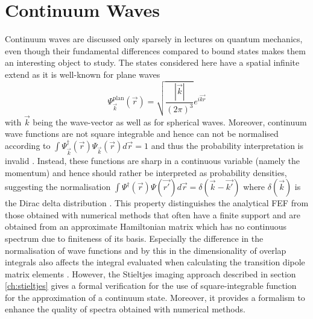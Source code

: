 \section{Continuum Waves}
\label{ch:contwa}
Continuum waves are discussed only sparsely in lectures on quantum mechanics, even though their fundamental differences compared to bound states makes them an interesting object to study.
The states considered here have a spatial infinite extend as it is well-known for plane waves 
\begin{equation}\label{eq:PlWave}
\Psi^\text{plan}_{\vec{k}} (\vec{r})=\sqrt{\frac{|\vec{k}|}{(2\pi)^3}}e^{i\vec{kr}}
\end{equation}
with $\vec{k}$ being the wave-vector as well as for spherical waves. %
Moreover, continuum wave functions are not square integrable and hence can not be normalised according to $\int \Psi_{\vec{k}}^\dagger(\vec{r})\Psi_{\vec{k}}(\vec{r}) d\vec{r}=1$ and thus the probability interpretation is invalid \cite{quirky}.
Instead, these functions are sharp in a continuous variable (namely the momentum) and hence should rather be interpreted as probability densities, suggesting the normalisation 
$\int \Psi^\dagger(\vec{r})\Psi(\vec{r'}) d\vec{r}=\delta(\vec{k}-\vec{k'})$ where $\delta(\vec{k})$ is the Dirac delta distribution \cite{quirky}.
This property distinguishes the analytical FEF from those obtained with numerical methods that often have a finite support and are obtained from an approximate Hamiltonian matrix which has no continuous spectrum due to finiteness of its basis.
Especially the difference in the normalisation of wave functions and by this in the dimensionality of overlap integrals also affects the integral evaluated when calculating the transition dipole matrix elements \cite{stieltjesCeder}.
However, the Stieltjes imaging approach described in section \ref{ch:stieltjes} gives a formal verification for the use of square-integrable function for the approximation of a continuum state. %
Moreover, it provides a formalism to enhance the quality of spectra obtained with numerical methods.

